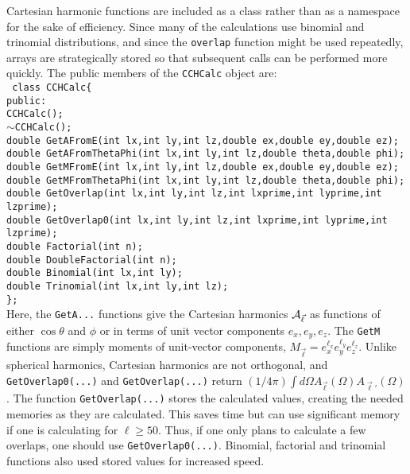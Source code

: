 \documentclass[10pt]{article}
\def\tab{\hspace*{9pt}}
\begin{document}
Cartesian harmonic functions are included as a class rather than as a namespace for the sake of efficiency. Since many of the calculations use binomial and trinomial distributions, and since the {\tt overlap} function might be used repeatedly, arrays are strategically stored so that subsequent calls can be performed more quickly. The public members of the {\tt CCHCalc} object are:\\
{\tt
class CCHCalc\{\\
\tab public:\\
\tab \tab CCHCalc();\\
\tab \tab $\sim$CCHCalc();\\
\tab \tab double GetAFromE(int lx,int ly,int lz,double ex,double ey,double ez);\\
\tab \tab double GetAFromThetaPhi(int lx,int ly,int lz,double theta,double phi);\\
\tab \tab double GetMFromE(int lx,int ly,int lz,double ex,double ey,double ez);\\
\tab \tab double GetMFromThetaPhi(int lx,int ly,int lz,double theta,double phi);\\

\tab \tab double GetOverlap(int lx,int ly,int lz,int lxprime,int lyprime,int lzprime);\\
\tab \tab double GetOverlap0(int lx,int ly,int lz,int lxprime,int lyprime,int lzprime);\\

\tab \tab double Factorial(int n);\\
\tab \tab double DoubleFactorial(int n);\\
\tab \tab double Binomial(int lx,int ly);\\
\tab \tab double Trinomial(int lx,int ly,int lz);\\
\};}\\ \noindent
Here, the {\tt GetA...} functions give the Cartesian harmonics ${\cal A}_{\vec{\ell}}$ as functions of either $\cos\theta$ and $\phi$ or in terms of unit vector components $e_x,e_y,e_z$. The {\tt GetM} functions are simply moments of unit-vector components, $M_{\vec{\ell}}=e_x^{\ell_x}e_y^{\ell_y}e_z^{\ell_z}$. Unlike spherical harmonics, Cartesian harmonics are not orthogonal, and {\tt GetOverlap0(...)} and {\tt GetOverlap(...)} return $(1/4\pi)\int d\Omega A_{\vec{\ell}}(\Omega)A_{\vec{\ell}'}(\Omega)$. The function {\tt GetOverlap(...)} stores the calculated values, creating the needed memories as they are calculated. This saves time but can use significant memory if one is calculating for $\ell\ge 50$. Thus, if one only plans to calculate a few overlaps, one should use {\tt GetOverlap0(...)}. Binomial, factorial and trinomial functions also used stored values for increased speed.
\end{document}
